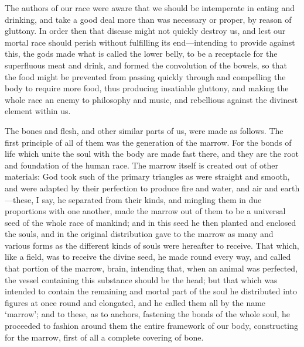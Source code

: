 The authors of our race were aware that we should be intemperate in eating
and drinking, and take a good deal more than was necessary or proper, by
reason of gluttony. In order then that disease might not quickly destroy
us, and lest our mortal race should perish without fulfilling its end—intending
to provide against this, the gods made what is called the lower belly, to
be a receptacle for the superfluous meat and drink, and formed the
convolution of the bowels, so that the food might be prevented from
passing quickly through and compelling the body to require more food, thus
producing insatiable gluttony, and making the whole race an enemy to
philosophy and music, and rebellious against the divinest element within
us.

The bones and flesh, and other similar parts of us, were made as follows.
The first principle of all of them was the generation of the marrow. For
the bonds of life which unite the soul with the body are made fast there,
and they are the root and foundation of the human race. The marrow itself
is created out of other materials: God took such of the primary triangles
as were straight and smooth, and were adapted by their perfection to
produce fire and water, and air and earth—these, I say, he separated
from their kinds, and mingling them in due proportions with one another,
made the marrow out of them to be a universal seed of the whole race of
mankind; and in this seed he then planted and enclosed the souls, and in
the original distribution gave to the marrow as many and various forms as
the different kinds of souls were hereafter to receive. That which, like a
field, was to receive the divine seed, he made round every way, and called
that portion of the marrow, brain, intending that, when an animal was
perfected, the vessel containing this substance should be the head; but
that which was intended to contain the remaining and mortal part of the
soul he distributed into figures at once round and elongated, and he
called them all by the name ‘marrow’; and to these, as to anchors,
fastening the bonds of the whole soul, he proceeded to fashion around them
the entire framework of our body, constructing for the marrow, first of
all a complete covering of bone.

